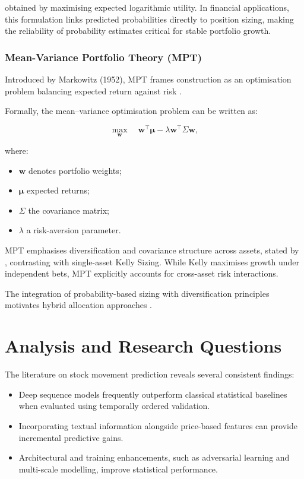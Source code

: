 \documentclass{l4proj}
\begin{document}
obtained by maximising expected logarithmic utility. In financial applications, this formulation links predicted probabilities directly to position sizing, making the reliability of probability estimates critical for stable portfolio growth.

\subsection{Mean-Variance Portfolio Theory (MPT)}

Introduced by Markowitz (1952), MPT frames construction as an optimisation problem balancing expected return against risk \citep{markowitz1952}. 

Formally, the mean–variance optimisation problem can be written as:

\[
\max_{\mathbf{w}} \quad \mathbf{w}^\top \boldsymbol{\mu} 
- \lambda \mathbf{w}^\top \Sigma \mathbf{w},
\]

where:
\begin{itemize}
    \item $\mathbf{w}$ denotes portfolio weights;
    \item $\boldsymbol{\mu}$ expected returns;
    \item $\Sigma$ the covariance matrix;
    \item $\lambda$ a risk-aversion parameter.
\end{itemize}

MPT emphasises diversification and covariance structure across assets, stated by \cite{markowitz1959}, contrasting with single-asset Kelly Sizing. While Kelly maximises growth under independent bets, MPT explicitly accounts for cross-asset risk interactions.

The integration of probability-based sizing with diversification principles motivates hybrid allocation approaches \citep{peterson2018kellyscriterionportfoliooptimization}.

\chapter{Analysis and Research Questions}

The literature on stock movement prediction reveals several consistent findings:

\begin{itemize}
    \item Deep sequence models frequently outperform classical statistical baselines when evaluated using temporally ordered validation.
    \item Incorporating textual information alongside price-based features can provide incremental predictive gains.
    \item Architectural and training enhancements, such as adversarial learning and multi-scale modelling, improve statistical performance.
\end{itemize}
\end{document}
